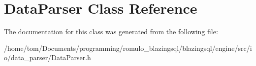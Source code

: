 \hypertarget{classDataParser}{}\section{Data\+Parser Class Reference}
\label{classDataParser}


The documentation for this class was generated from the following file\+:\begin{DoxyCompactItemize}
\item 
/home/tom/\+Documents/programming/romulo\+\_\+blazingsql/blazingsql/engine/src/io/data\+\_\+parser/Data\+Parser.\+h\end{DoxyCompactItemize}
